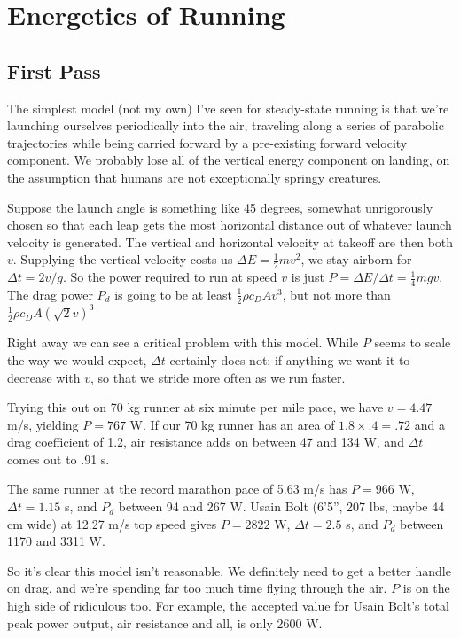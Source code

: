\documentclass[12pt]{article}
\begin{document}
\section{Energetics of Running}

\subsection{First Pass}

The simplest model (not my own) I've seen for steady-state running is that we're launching ourselves periodically into the air, traveling along a series of parabolic trajectories while being carried forward by a pre-existing forward velocity component. We probably lose all of the vertical energy component on landing, on the assumption that humans are not exceptionally springy creatures.

Suppose the launch angle is something like 45 degrees, somewhat unrigorously chosen so that each leap gets the most horizontal distance out of whatever launch velocity is generated. The vertical and horizontal velocity at takeoff are then both \(v\). Supplying the vertical velocity costs us \(\Delta E = \frac{1}{2}mv^2\), we stay airborn for \(\Delta t = 2v/g\). So the power required to run at speed \(v\) is just \(P = \Delta E / \Delta t=\frac{1}{4}mgv\). The drag power \(P_d\) is going to be at least \(\frac{1}{2}\rho c_D A v^3\), but not more than \(\frac{1}{2}\rho c_D A (\sqrt{2}v)^3\)

Right away we can see a critical problem with this model. While \(P\) seems to scale the way we would expect, \(\Delta t\) certainly does not: if anything we want it to decrease with \(v\), so that we stride more often as we run faster. 

Trying this out on 70 kg runner at six minute per mile pace, we have \(v = 4.47\) m/s, yielding \(P = 767\) W. If our 70 kg runner has an area of \(1.8 \times .4 = .72\) \msq and a drag coefficient of 1.2, air resistance adds on between 47 and 134 W, and \(\Delta t\) comes out to .91 s.

The same runner at the record marathon pace of 5.63 m/s has \(P = 966\) W, \(\Delta t = 1.15\) s, and \(P_d\) between 94 and 267 W. Usain Bolt (6'5'', 207 lbs, maybe 44 cm wide) at 12.27 m/s top speed gives \(P = 2822\) W, \(\Delta t = 2.5\) s, and \(P_d\) between 1170 and 3311 W.

So it's clear this model isn't reasonable. We definitely need to get a better handle on drag, and we're spending far too much time flying through the air. \(P\) is on the high side of ridiculous too. For example, the accepted value for Usain Bolt's total peak power output, air resistance and all, is only 2600 W.
\end{document}
